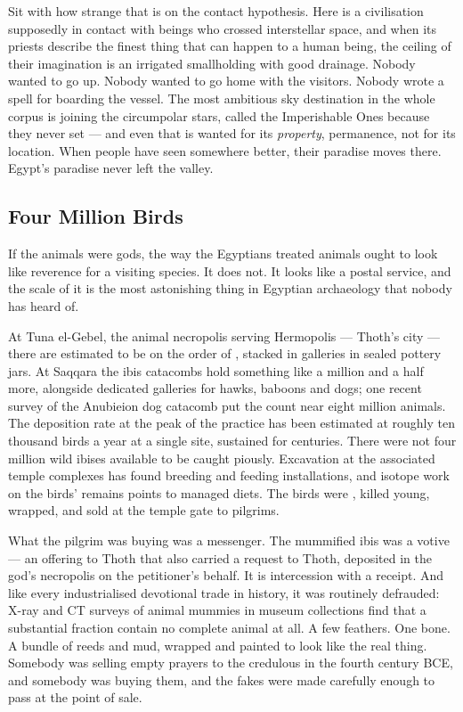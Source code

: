 Sit with how strange that is on the contact hypothesis. Here is a civilisation supposedly in
contact with beings who crossed interstellar space, and when its priests describe the finest
thing that can happen to a human being, the ceiling of their imagination is an irrigated
smallholding with good drainage. Nobody wanted to go up. Nobody wanted to go home with the
visitors. Nobody wrote a spell for boarding the vessel. The most ambitious sky destination in the
whole corpus is joining the circumpolar stars, called the Imperishable Ones because they never
set --- and even that is wanted for its \emph{property}, permanence, not for its location. When
people have seen somewhere better, their paradise moves there. Egypt's paradise never left the
valley.


\subsection{Four Million Birds}\label{sec:fourmillionbirds}

If the animals were gods, the way the Egyptians treated animals ought to look like reverence for
a visiting species. It does not. It looks like a postal service, and the scale of it is the most
astonishing thing in Egyptian archaeology that nobody has heard of.

At Tuna el-Gebel, the animal necropolis serving Hermopolis --- Thoth's city --- there are
estimated to be on the order of , stacked in galleries in
sealed pottery jars. At Saqqara the ibis catacombs hold something like a million and a half more,
alongside dedicated galleries for hawks, baboons and dogs; one recent survey of the Anubieion dog
catacomb put the count near eight million animals. The deposition rate at the peak of the practice
has been estimated at roughly ten thousand birds a year at a single site, sustained for centuries.
There were not four million wild ibises available to be caught piously. Excavation at the
associated temple complexes has found breeding and feeding installations, and isotope work on the
birds' remains points to managed diets. The birds were , killed young,
wrapped, and sold at the temple gate to pilgrims.

What the pilgrim was buying was a messenger. The mummified ibis was a votive --- an offering to
Thoth that also carried a request to Thoth, deposited in the god's necropolis on the petitioner's
behalf. It is intercession with a receipt. And like every industrialised devotional trade in
history, it was routinely defrauded: X-ray and CT surveys of animal mummies in museum collections
find that a substantial fraction contain no complete animal at all. A few feathers. One bone. A
bundle of reeds and mud, wrapped and painted to look like the real thing. Somebody was selling
empty prayers to the credulous in the fourth century BCE, and somebody was buying them, and the
fakes were made carefully enough to pass at the point of sale.

